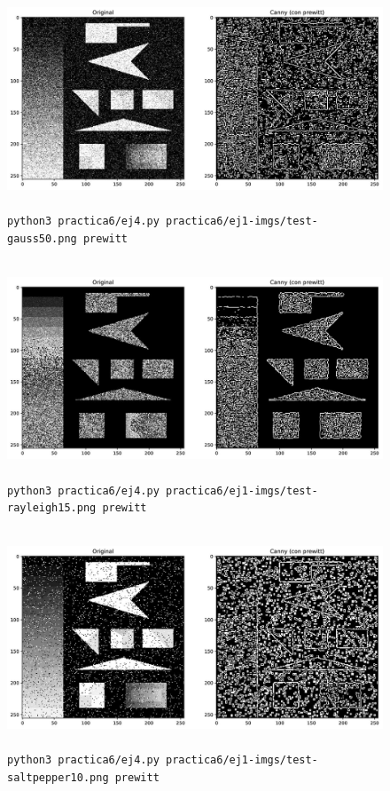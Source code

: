 \documentclass[11pt, spanish]{article}
\begin{document}
\begin{figure}[H]
\centering
    \includegraphics[height=6.5cm]{informe-imgs/ej4-prewitt-test-gauss50.jpg}
    \caption{\texttt{python3 practica6/ej4.py practica6/ej1-imgs/test-gauss50.png prewitt}}
\end{figure}

\begin{figure}[H]
\centering
    \includegraphics[height=6.5cm]{informe-imgs/ej4-prewitt-test-rayleigh15.jpg}
    \caption{\texttt{python3 practica6/ej4.py practica6/ej1-imgs/test-rayleigh15.png prewitt}}
\end{figure}

\begin{figure}[H]
\centering
    \includegraphics[height=6.5cm]{informe-imgs/ej4-prewitt-test-saltpepper10.jpg}
    \caption{\texttt{python3 practica6/ej4.py practica6/ej1-imgs/test-saltpepper10.png prewitt}}
\end{figure}
\end{document}
